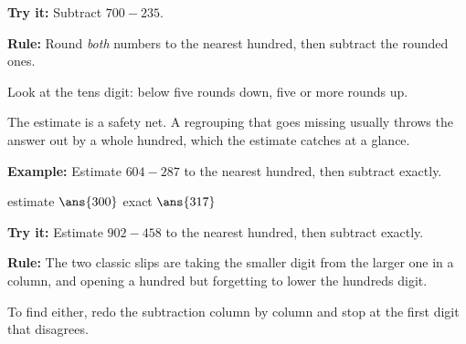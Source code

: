 \documentclass[12pt]{article}
\begin{document}
\begin{tryitbox}
\textbf{Try it:} \quad Subtract $700 - 235$.\\[2pt]
\end{tryitbox}


\begin{formulabox}
\textbf{Rule:} Round \emph{both} numbers to the nearest hundred, then subtract the rounded ones.\par
Look at the tens digit: below five rounds down, five or more rounds up.\par
The estimate is a safety net. A regrouping that goes missing usually throws the answer out by a whole hundred, which the estimate catches at a glance.
\end{formulabox}

\begin{examplebox}
\textbf{Example:} \quad Estimate $604 - 287$ to the nearest hundred, then subtract exactly.

estimate $\ans{300}$ \qquad exact $\ans{317}$
\end{examplebox}

\begin{tryitbox}
\textbf{Try it:} \quad Estimate $902 - 458$ to the nearest hundred, then subtract exactly.\\[2pt]
\end{tryitbox}


\begin{formulabox}
\textbf{Rule:} The two classic slips are taking the smaller digit from the larger one in a column, and opening a hundred but forgetting to lower the hundreds digit.\par
To find either, redo the subtraction column by column and stop at the first digit that disagrees.
\end{formulabox}
\end{document}

